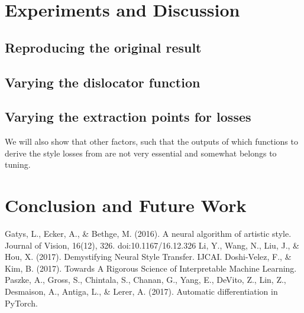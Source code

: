 \documentclass[runningheads]{llncs}
\begin{document}
\section{Experiments and Discussion}

\subsection{Reproducing the original result}

\subsection{Varying the dislocator function}

\subsection{Varying the extraction points for losses}

We will also show that other factors, such that the outputs of which functions to derive the style 
losses from are not very essential and somewhat belongs to tuning.

\section{Conclusion and Future Work}

\begin{thebibliography}{8}
Gatys, L., Ecker, A., \& Bethge, M. (2016). A neural algorithm of artistic style. Journal of Vision, 16(12), 326. doi:10.1167/16.12.326
Li, Y., Wang, N., Liu, J., \& Hou, X. (2017). Demystifying Neural Style Transfer. IJCAI.
Doshi-Velez, F., \& Kim, B. (2017). Towards A Rigorous Science of Interpretable Machine Learning.
Paszke, A., Gross, S., Chintala, S., Chanan, G., Yang, E., DeVito, Z., Lin, Z., Desmaison, A., Antiga, L., \& Lerer, A. (2017). Automatic differentiation in PyTorch.
\end{thebibliography}
\end{document}
